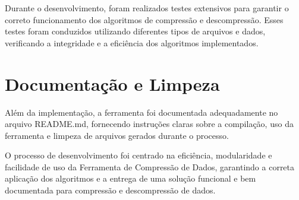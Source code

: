Durante o desenvolvimento, foram realizados testes extensivos para garantir o correto funcionamento dos algoritmos de compressão e descompressão. Esses testes foram conduzidos utilizando diferentes tipos de arquivos e dados, verificando a integridade e a eficiência dos algoritmos implementados.

\section{Documentação e Limpeza}

Além da implementação, a ferramenta foi documentada adequadamente no arquivo README.md, fornecendo instruções claras sobre a compilação, uso da ferramenta e limpeza de arquivos gerados durante o processo.

O processo de desenvolvimento foi centrado na eficiência, modularidade e facilidade de uso da Ferramenta de Compressão de Dados, garantindo a correta aplicação dos algoritmos e a entrega de uma solução funcional e bem documentada para compressão e descompressão de dados.
